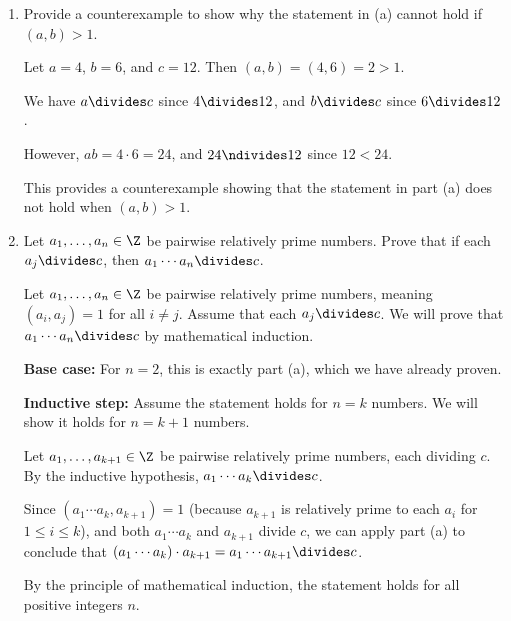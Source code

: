 \begin{enumerate}
\begin{enumerate}
\begin{subanswer}
      Therefore, there exists an integer $m$ such that $k = bm$. Substituting back, we get $c = ak = a(bm) = (ab)m$, which shows that $ab \divides c$.
      
      Hence, if $(a,b) = 1$, $a \divides c$, and $b \divides c$, then $ab \divides c$.
    \end{subanswer}
    \item Provide a counterexample to show why the statement in (a) cannot hold if $(a,b)>1$.
    \begin{subanswer}
      Let $a = 4$, $b = 6$, and $c = 12$. Then $(a,b) = (4,6) = 2 > 1$.
      
      We have $a \divides c$ since $4 \divides 12$, and $b \divides c$ since $6 \divides 12$.
      
      However, $ab = 4 \cdot 6 = 24$, and $24 \ndivides 12$ since $12 < 24$.
      
      This provides a counterexample showing that the statement in part (a) does not hold when $(a,b) > 1$.
    \end{subanswer}
    \item Let $a_1, \ldots, a_n \in \Z$ be pairwise relatively prime numbers. Prove that if each $a_j \divides c$, then $a_1 \cdots a_n \divides c$.
    \begin{subanswer}
      Let $a_1, \ldots, a_n \in \Z$ be pairwise relatively prime numbers, meaning $(a_i, a_j) = 1$ for all $i \neq j$. Assume that each $a_j \divides c$. We will prove that $a_1 \cdots a_n \divides c$ by mathematical induction.
      
      \textbf{Base case:} For $n = 2$, this is exactly part (a), which we have already proven.
      
      \textbf{Inductive step:} Assume the statement holds for $n = k$ numbers. We will show it holds for $n = k + 1$ numbers.
      
      Let $a_1, \ldots, a_{k+1} \in \Z$ be pairwise relatively prime numbers, each dividing $c$. By the inductive hypothesis, $a_1 \cdots a_k \divides c$.
      
      Since $(a_1 \cdots a_k, a_{k+1}) = 1$ (because $a_{k+1}$ is relatively prime to each $a_i$ for $1 \leq i \leq k$), and both $a_1 \cdots a_k$ and $a_{k+1}$ divide $c$, we can apply part (a) to conclude that $(a_1 \cdots a_k) \cdot a_{k+1} = a_1 \cdots a_{k+1} \divides c$.
      
      By the principle of mathematical induction, the statement holds for all positive integers $n$.
      

\end{subanswer}
\end{enumerate}
\end{enumerate}
